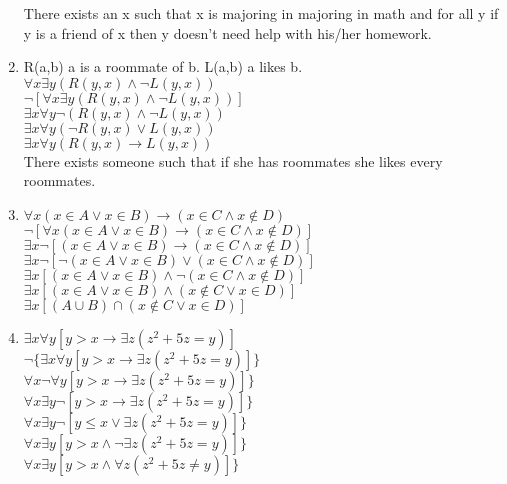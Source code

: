 \documentclass{article}
\begin{document}
\begin{enumerate}[label=(\alph*)]
    There exists an x such that x is majoring in majoring in math and for all y if y is a friend of x then y doesn't need help with his/her homework.
    \item
    R(a,b) a is a roommate of b.
    L(a,b) a likes b.
    \\
    $\forall x \exists y(R(y,x)\land \neg L(y,x))$
    \\
    $\neg[\forall x \exists y(R(y,x)\land \neg  L(y,x))]$
    \\
    $\exists x \forall y \neg ( R(y,x)\land  \neg L(y,x))$
    \\
    $\exists x \forall y(\neg R(y,x)\lor  L(y,x))$
    \\
    \underline{$\exists x \forall y (R(y,x)\rightarrow  L(y,x))$}
    \\
    There exists someone such that  if she has roommates she likes every roommates.
    \item
    $\forall x (x \in A \lor x \in B)\rightarrow(x \in C \land x \notin D)$
    \\
    $\neg [\forall x (x \in A \lor x \in B) \rightarrow (x \in C \land x \notin D)]$
    \\
    $\exists x \neg [(x \in A \lor x \in B)\rightarrow (x \in C \land x \notin D)]$
    \\
    $\exists x \neg[\neg(x \in A \lor x \in B) \lor (x \in C \land x \notin D)]$
    \\
    $\exists x [(x \in A \lor x \in B)\land \neg(x \in C \land x \notin D )]$
    \\
    $\exists x[(x \in A \lor x \in B)\land (x \notin C \lor x \in D)]$
    \\
    $\exists x[(A \cup B)\cap(x \notin C \lor x \in D)]$
    \item
    $\exists x \forall y [y > x \rightarrow \exists z(z^2+ 5z = y)]$
    \\
    $\neg \{ \exists x \forall y [y > x \rightarrow \exists z(z^2+ 5z = y)]\} $
    \\
    $\forall  x \neg  \forall y [y > x \rightarrow \exists z(z^2+ 5z = y)]\} $
    \\
    $\forall  x \exists y \neg [y > x \rightarrow \exists z(z^2+ 5z = y)]\} $
    \\
    $\forall  x \exists y \neg [y \leq x \lor \exists z(z^2+ 5z = y)]\}$
    \\
    $\forall  x \exists y [y > x \land \neg \exists z(z^2+ 5z = y)]\}$
    \\
    $\forall  x \exists y [y > x \land \forall z (z^2+ 5z \neq y)]\}$
\end{enumerate}
\end{document}
